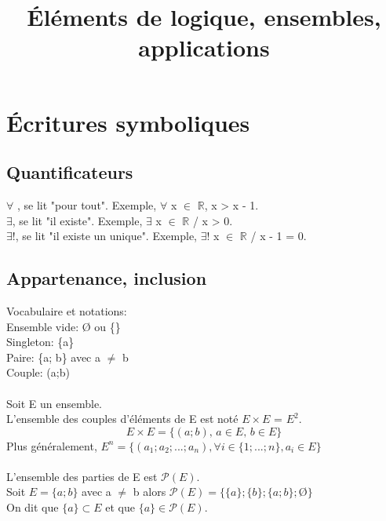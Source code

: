 \documentclass[a4paper,french,12pt]{article}
\title{\textbf{Éléments de logique, ensembles, applications}}
\date{}
\begin{document}
\maketitle
\section{Écritures symboliques}
\subsection{Quantificateurs}
\vspace{0.1cm}
\noindent
$\forall$ , se lit "pour tout". Exemple, $\forall$ x $\in$ $\mathbb{R}$, x > x - 1.\\
$\exists$, se lit "il existe". Exemple, $\exists$ x $\in$ $\mathbb{R}$ / x > 0.\\
$\exists$!, se lit "il existe un unique". Exemple, $\exists$! x $\in$ $\mathbb{R}$ / x - 1 = 0.\\

\subsection{Appartenance, inclusion}
\vspace{0.1cm}
\noindent
Vocabulaire et notations:\\
\indent Ensemble vide: \O \: ou \{\}\\
\indent Singleton: \{a\}\\
\indent Paire: \{a; b\} avec a $\neq$ b\\
\indent Couple: (a;b)\\
\\
Soit E un ensemble.\\
L'ensemble des couples d'éléments de E est noté $E \times E$ = $E^2$.
\begin{displaymath}
E \times E = \{ (a;b),\, a \in E,\, b \in E \}
\end{displaymath}
Plus généralement, $E^n = \{(a_1;a_2;...;a_n), \forall i \in \{1;...;n\}, a_i \in E\}$\\
\\
L'ensemble des parties de E est $\mathcal{P}(E)$.\\
Soit $E = \{a;b\}$ avec a $\neq$ b alors $\mathcal{P}(E) = \{ \{a\}; \{b\}; \{a;b\};$\O$\}$\\
On dit que $\{a\} \subset E$ et que $\{a\} \in \mathcal{P}(E)$.
\end{document}
